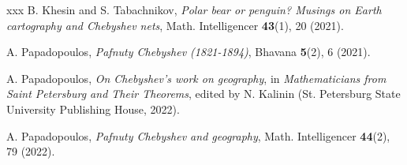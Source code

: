 \documentclass[12pt]{article}
\begin{document}
\begin{thebibliography}{xxx}
B. Khesin and S. Tabachnikov, {\it Polar bear or penguin? Musings on Earth cartography and Chebyshev nets}, Math. Intelligencer {\bf 43}(1), 20 (2021).

A. Papadopoulos, {\it Pafnuty Chebyshev (1821-1894)}, Bhavana {\bf 5}(2), 6 (2021).

A. Papadopoulos, {\it On Chebyshev's work on geography}, in {\it Mathematicians from Saint Petersburg and Their Theorems}, edited by N. Kalinin (St. Petersburg State University Publishing House, 2022).

A. Papadopoulos, {\it Pafnuty Chebyshev and geography}, Math. Intelligencer {\bf 44}(2), 79 (2022).

\end{thebibliography}

\end{document}
